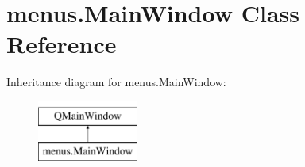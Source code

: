 \hypertarget{classmenus_1_1MainWindow}{}\section{menus.\+Main\+Window Class Reference}
\label{classmenus_1_1MainWindow}
Inheritance diagram for menus.\+Main\+Window\+:\begin{figure}[H]
\begin{center}
\leavevmode
\includegraphics[height=2.000000cm]{classmenus_1_1MainWindow}
\end{center}
\end{figure}
